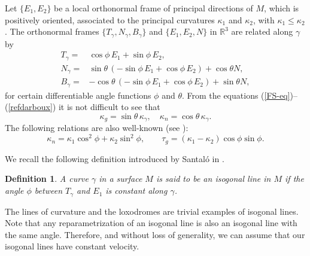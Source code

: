 \documentclass[11pt,a4paper]{article}
\def\R#1{\ensuremath{\mathbb{R}^{#1}}}
\def\g{\gamma}
\newtheorem{defi}{Definition}
\begin{document}
Let $\{E_1,E_2\}$ be a local orthonormal frame of principal directions of $M$, which is positively oriented, associated to the principal curvatures $\kappa_1$ and $\kappa_2$, with $\kappa_1\leq\kappa_2$. The orthonormal frames  $\{T_\g,N_\g,B_\g\}$ and $\{E_1,E_2,N\}$ in $\R3$ are related along $\gamma$ by
\begin{align}\label{refdarboux}
 T_\gamma= & \cos\phi\,E_1+\sin\phi\,E_2,\nonumber\\
 N_\gamma= & \sin\theta\,(-\sin\phi\,E_1+\cos\phi\,E_2)+\cos\theta N,\\
 B_\gamma= & -\cos\theta\,(-\sin\phi\,E_1+\cos\phi\,E_2)+\sin\theta N,\nonumber
\end{align}
for certain differentiable angle functions $\phi$ and $\theta$. From the equations (\ref{FS-eq})--(\ref{refdarboux}) it is not difficult to see that
\begin{equation}\label{kgkn}
\kappa_g =\sin\theta\,\kappa_\gamma,\quad\kappa_n =\cos\theta\,\kappa_\gamma.
\end{equation}
The following relations are also well-known (see \cite[pp. 145, 153]{DoCarmo76}):
\begin{equation}\label{kntg}
\kappa_n=\kappa_1\cos^2\phi+\kappa_2\sin^2\phi,\qquad
\tau_g=(\kappa_1-\kappa_2)\cos\phi\sin\phi.
\end{equation}

We recall the following definition introduced by Santaló in \cite{Santalo43}.
\begin{defi}
A curve $\gamma$ in a surface $M$ is said to be an \emph{isogonal line in $M$} if the angle $\phi$ between $T_\g$ and $E_1$ is constant along $\g$.
\end{defi}
The lines of curvature and the loxodromes are trivial examples of isogonal lines. Note that any reparametrization of an isogonal line is also an isogonal line with the same angle. Therefore, and without loss of generality, we can assume that our isogonal lines have constant velocity.
\end{document}
